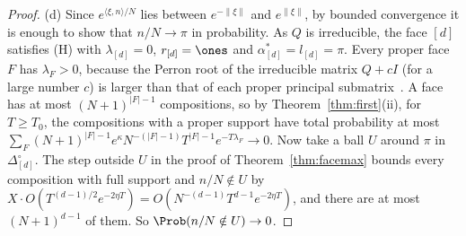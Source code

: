 \begin{proof}
(d) Since $e^{\langle\xi,n\rangle/N}$ lies between $e^{-\lVert\xi\rVert}$ and $e^{\lVert\xi\rVert}$,
by bounded convergence it is enough to show that $n/N\to\pi$ in probability. As $Q$ is
irreducible, the face $[d]$ satisfies (H) with $\lambda_{[d]}=0$, $r_{[d]}=\ones$ and
$\alpha^*_{[d]}=l_{[d]}=\pi$. Every proper face $F$ has $\lambda_F>0$, because the Perron
root of the irreducible matrix $Q+cI$ (for a large number $c$) is larger than that of each
proper principal submatrix~\cite{bermanplemmons1994}. A face has at most $(N+1)^{|F|-1}$
compositions, so by Theorem~\ref{thm:first}(ii), for $T\ge T_0$, the compositions with a
proper support have total probability at most
$\sum_F(N+1)^{|F|-1}e^\kappa N^{-(|F|-1)}T^{|F|-1}e^{-T\lambda_F}\to0$. Now take a ball $U$
around $\pi$ in $\Delta_{[d]}^\circ$. The step outside $U$ in the proof of
Theorem~\ref{thm:facemax} bounds every composition with full support and $n/N\notin U$
by $X\cdot O(T^{(d-1)/2}e^{-2\eta T})=O(N^{-(d-1)}T^{d-1}e^{-2\eta T})$, and there are at
most $(N+1)^{d-1}$ of them. So $\Prob(n/N\notin U)\to0$.
\end{proof}
